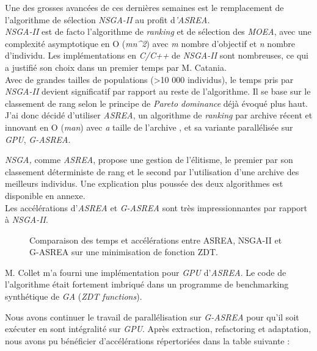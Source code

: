 \documentclass[12pt]{memoir}
\begin{document}
Une des grosses avancées de ces dernières semaines est le remplacement
de l'algorithme de sélection \emph{NSGA-II\cite{deb2002fast}} au profit d\emph{'ASREA\cite{sharma2010archived,tsutsui2013massively}}.\\
\emph{NSGA-II} est de facto l'algorithme de \emph{ranking} et de
sélection des \emph{MOEA}, avec une complexité asymptotique en O
(\emph{mn\^{}2}) avec \emph{m} nombre d'objectif et \emph{n} nombre
d'individu. Les implémentations en \emph{C/C++} de \emph{NSGA-II} sont
nombreuses, ce qui a justifié son choix dans un premier temps par M.
Catania.\\
Avec de grandes tailles de populations (\textgreater{}10 000
individus), le temps pris par \textit{NSGA-II} devient significatif par
rapport au reste de l'algorithme. Il se base sur le classement de rang
selon le principe de \textit{Pareto dominance} déjà évoqué plus haut. J'ai donc
décidé d'utiliser \textit{ASREA}, un algorithme de \textit{ranking} par archive
récent et innovant en O (\emph{man}) avec \emph{a} taille de l'archive ,
et sa variante parallélisée sur \emph{GPU}, \emph{G-ASREA\cite{sharma2010gpgpu}}.

\bigskip
\emph{NSGA,} comme \emph{ASREA}, propose une gestion de l'élitisme, le
premier par son classement déterministe de rang et le second par
l'utilisation d'une archive des meilleurs individus. Une explication
plus poussée des deux algorithmes est disponible en annexe. \\
Les accélérations d'\emph{ASREA} et \emph{G-ASREA} sont très
impressionnantes par rapport à \emph{NSGA-II}.
\begin{figure}[htbp]
	\begin{center}
		\caption{Comparaison des temps et accélérations entre ASREA, NSGA-II et G-ASREA sur une minimisation de fonction ZDT\cite{zitzler2000comparison}.}
	\end{center}
\end{figure}
M. Collet m'a fourni une implémentation pour \textit{GPU} d'\emph{ASREA}. Le
code de l'algorithme était fortement imbriqué dans un programme de
benchmarking synthétique de \emph{GA} (\emph{ZDT functions\cite{zitzler2000comparison}}).

Nous avons continuer le travail de parallélisation sur \textit{G-ASREA} pour
qu'il soit exécuter en sont intégralité sur \textit{GPU}. Après extraction,
refactoring et adaptation, nous avons pu bénéficier d'accélérations
répertoriées dans la table suivante :
\end{document}
